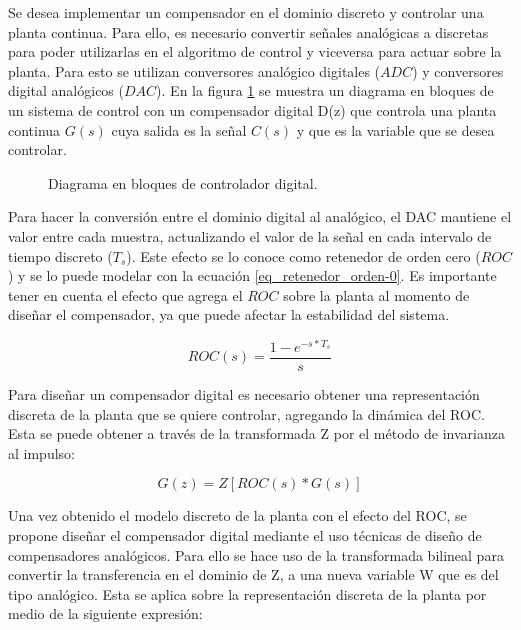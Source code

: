 Se desea implementar un compensador en el dominio discreto y controlar una planta continua. Para ello, es necesario convertir señales analógicas a discretas para poder utilizarlas en el algoritmo de control y viceversa para actuar sobre la planta. Para esto se utilizan conversores analógico digitales ($ADC$) y conversores digital analógicos ($DAC$). En la figura \ref{fig:diag-general-digital} se muestra un diagrama en bloques de un sistema de control con un compensador digital D(z) que controla una planta continua $G(s)$ cuya salida es la señal $C(s)$ y que es la variable que se desea controlar.

\begin{figure}[H]
	\centering
	
	\caption{Diagrama en bloques de controlador digital.}	\label{fig:diag-general-digital}
\end{figure}


Para hacer la conversión entre el dominio digital al analógico, el DAC mantiene el valor entre cada muestra, actualizando el valor de la señal en cada intervalo de tiempo discreto ($T_s$). Este efecto se lo conoce como retenedor de orden cero ($ROC$) y se lo puede modelar con la ecuación \ref{eq_retenedor_orden-0}. Es importante tener en cuenta el efecto que agrega el $ROC$ sobre la planta al momento de diseñar el compensador, ya que puede afectar la estabilidad del sistema.

\begin{equation}\label{eq_retenedor_orden-0}
	ROC(s)=\frac{1-e^{-s*T_s}}{s}
\end{equation}

Para diseñar un compensador digital es necesario obtener una representación discreta de la planta que se quiere controlar, agregando la dinámica del ROC. Esta se puede obtener a través de la transformada Z por el método de invarianza al impulso:

\begin{equation*}
	G(z)= Z[ROC(s)*G(s)]
\end{equation*}

Una vez obtenido el modelo discreto de la planta con el efecto del ROC, se propone diseñar el compensador digital mediante el uso técnicas de diseño de compensadores analógicos. Para ello se hace uso de la transformada bilineal para convertir la transferencia en el dominio de Z, a una nueva variable W que es del tipo analógico. Esta se aplica sobre la representación discreta de la planta por medio de la siguiente expresión:


